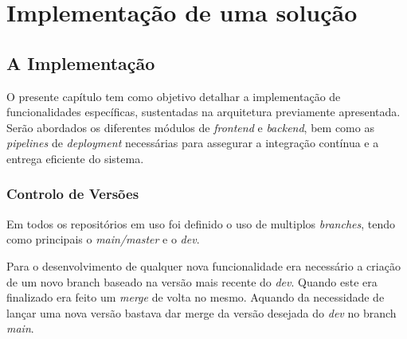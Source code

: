 \chapter{Implementação de uma solução}

\section{A Implementação}

O presente capítulo tem como objetivo detalhar a implementação de funcionalidades específicas, sustentadas na arquitetura previamente apresentada. Serão abordados os diferentes módulos de \textit{frontend} e \textit{backend}, bem como as \textit{pipelines} de \textit{deployment} necessárias para assegurar a integração contínua e a entrega eficiente do sistema.





\subsection{Controlo de Versões}

Em todos os repositórios em uso foi definido o uso de multiplos \textit{branches}, tendo como principais o \textit{main/master} e o \textit{dev}. 

Para o desenvolvimento de qualquer nova funcionalidade era necessário a criação de um novo branch baseado na versão mais recente do \textit{dev}. Quando este era finalizado era feito um \textit{merge} de volta no mesmo. Aquando da necessidade de lançar uma nova versão bastava dar merge da versão desejada do \textit{dev} no branch \textit{main}.







